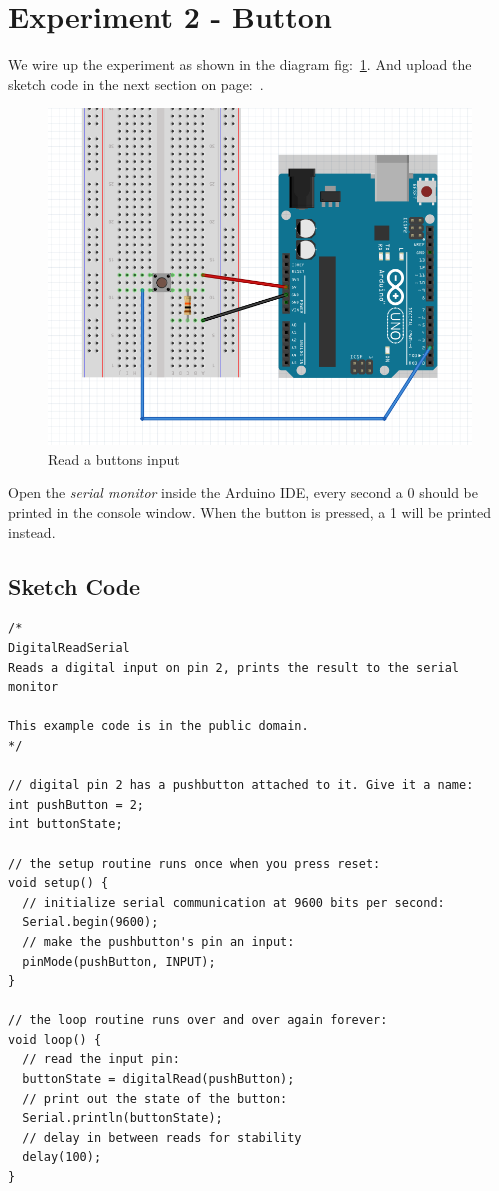 \chapter*{Experiment 2 - Button}
We wire up the experiment as shown in the diagram fig:~\ref{fig:exp2_button}. And upload the sketch code in the next section on page:~\pageref{sketch:exp2}.

%
\begin{figure}[ht]
	\centering
	\includegraphics[width=12cm]{images/08}
	\caption{Read a buttons input \citep{fritzing-15}}
	\label{fig:exp2_button}
\end{figure}
%

Open the \textit{serial monitor} inside the \gls{Arduino} IDE, every second a 0 should be printed in the console window. When the button is pressed, a 1 will be printed instead.

\newpage
\section*{Sketch Code}
\label{sketch:exp2}
\begin{lstlisting}
/*
DigitalReadSerial
Reads a digital input on pin 2, prints the result to the serial monitor

This example code is in the public domain.
*/

// digital pin 2 has a pushbutton attached to it. Give it a name:
int pushButton = 2;
int buttonState;

// the setup routine runs once when you press reset:
void setup() {
  // initialize serial communication at 9600 bits per second:
  Serial.begin(9600);
  // make the pushbutton's pin an input:
  pinMode(pushButton, INPUT);
}

// the loop routine runs over and over again forever:
void loop() {
  // read the input pin:
  buttonState = digitalRead(pushButton);
  // print out the state of the button:
  Serial.println(buttonState);
  // delay in between reads for stability
  delay(100);
}
\end{lstlisting}